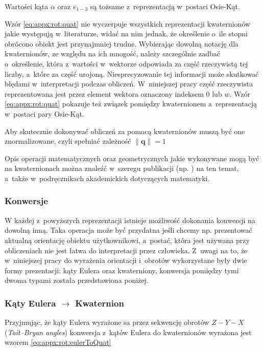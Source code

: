 Wartości kąta $\alpha$ oraz $e_{1-3}$ są tożsame z~reprezentacją w~postaci Osie-Kąt.
		
Wzór \eqref{eq:appx:rot:quat} nie wyczerpuje wszystkich reprezentacji kwaternionów jakie występują w~literaturze, widać na nim jednak, że określenie o~ile stopni obrócono obiekt jest przynajmniej trudne. Wybierając dowolną notację dla kwaternionów, ze względu na ich mnogość, należy szczególnie zadbać o~określenie, która z~wartości w~wektorze odpowiada za część rzeczywistą tej liczby, a~które za część urojoną. Niesprecyzowanie tej informacji może skutkować błędami w~interpretacji podczas obliczeń. W~niniejszej pracy część rzeczywista reprezentowana jest przez element wektora oznaczony indeksem $0$ lub $w$. Wzór \eqref{eq:appx:rot:quat} pokazuje też związek pomiędzy kwaternionem a~reprezentacją w~postaci pary Osie-Kąt.
		
Aby skutecznie dokonywać obliczeń za pomocą kwaternionów muszą być one znormalizowane, czyli spełniać zależność $\|\mathbf{q}\| = 1$
		
Opis operacji matematycznych oraz geometrycznych jakie wykonywane mogą być na kwaternionach można znaleźć w~szeregu publikacji (np. \cite{Dantam2014}) na ten temat, a~także w~podręcznikach akademickich dotyczących matematyki.
		
\subsubsection*{Konwersje}
W każdej z~powyższych reprezentacji istnieje możliwość dokonania konwersji na dowolną inną. Taka operacja może być przydatna jeśli chcemy np. prezentować aktualną orientację obiektu użytkownikowi, a~postać, która jest używana przy obliczeniach nie jest łatwa do interpretacji przez człowieka. Z~uwagi na to, że w~niniejszej pracy do wyrażenia orientacji i~obrotów wykorzystane były dwie formy prezentacji: kąty Eulera oraz kwaterniony, konwersja pomiędzy tymi dwoma typami została przedstawiona poniżej.
		
\subsubsection*{Kąty Eulera $\rightarrow$ Kwaternion}
Przyjmując, że kąty Eulera wyrażone sa przez sekwencję obrotów $Z-Y-X$ (\emph{Tait–Bryan angles}) konwersja z~kątów Eulera do kwaternionów wyrażona jest wzorem \eqref{eq:appx:rot:eulerToQuat}
		
